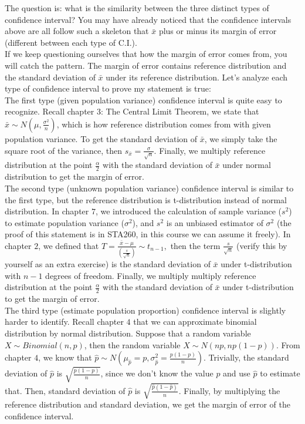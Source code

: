 \noindent
The question is: what is the similarity between the three distinct types of confidence interval? You may have already noticed that the confidence intervals above are all follow such a skeleton that $\bar{x}$ plus or minus its margin of error (different between each type of C.I.).\\ 

\noindent
If we keep questioning ourselves that how the margin of error comes from, you will catch the pattern. The margin of error contains reference distribution and the standard deviation of $\bar{x}$ under its reference distribution. Let's analyze each type of confidence interval to prove my statement is true:\\

\noindent
The first type (given population variance) confidence interval is quite easy to recognize. Recall chapter $3$: The Central Limit Theorem, we state that $\bar{x} \sim N(\mu, \frac{\sigma^2}{n})$, which is how reference distribution comes from with given population variance. To get the standard deviation of $\bar{x}$, we simply take the square root of the variance, then $s_{\bar{x}} = \frac{\sigma}{\sqrt{n}}$. Finally, we multiply reference distribution at the point $\frac{\alpha}{2}$ with the standard deviation of $\bar{x}$ under normal distribution to get the margin of error.\\

\noindent
The second type (unknown population variance) confidence interval is similar to the first type, but the reference distribution is t-distribution instead of normal distribution. In chapter $7$, we introduced the calculation of sample variance ($s^2$) to estimate population variance ($\sigma^2$), and $s^2$ is an unbiased estimator of $\sigma^2$ (the proof of this statement is in STA260, in this course we can assume it freely). In chapter $2$, we defined that $T = \frac{\bar{x} - \mu}{(\frac{s}{\sqrt{n}})} \sim t_{n-1},$ then the term $\frac{s}{\sqrt{n}}$ (verify this by yourself as an extra exercise) is the standard deviation of $\bar{x}$ under t-distribution with $n-1$ degrees of freedom. Finally, we multiply multiply reference distribution at the point $\frac{\alpha}{2}$ with the standard deviation of $\bar{x}$ under t-distribution to get the margin of error.\\

\noindent
The third type (estimate population proportion) confidence interval is slightly harder to identify. Recall chapter $4$ that we can approximate binomial distribution by normal distribution. Suppose that a random variable $X \sim Binomial(n,p)$, then the random variable $X \sim N(np, np(1-p)).$ From chapter $4$, we know that $\hat{p} \sim N(\mu_{\hat{p}} = p, \sigma_{\hat{p}}^{2} = \frac{p(1-p)}{n})$. Trivially, the standard deviation of $\hat{p}$ is $\sqrt{\frac{p(1-p)}{n}}$, since we don't know the value $p$ and use $\hat{p}$ to estimate that. Then, standard deviation of $\hat{p}$ is $\sqrt{\frac{\hat{p}(1-\hat{p})}{n}}$. Finally, by multiplying the reference distribution and standard deviation, we get the margin of error of the confidence interval.\\

